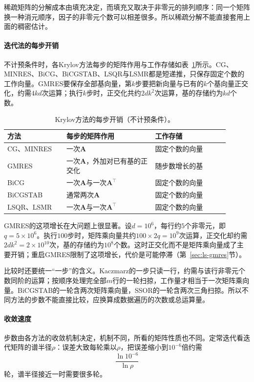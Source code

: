 稀疏矩阵的分解成本由填充决定，而填充又取决于非零元的排列顺序：同一个矩阵换一种消元顺序，因子的非零元个数可以相差很多。所以稀疏分解不能直接套用上面的稠密估计。

\paragraph{迭代法的每步开销}
不计预条件时，各Krylov方法每步的矩阵作用与工作存储如表~\ref{tab:ls-iterative-cost}所示。CG、MINRES、BiCG、BiCGSTAB、LSQR与LSMR都是短递推，只保存固定个数的工作向量。GMRES要保存全部基向量，第$k$步要把新向量与已有的$k$个基向量正交化，约需$4kd$次运算；执行$k$步时，正交化共约$2dk^2$次运算，基的存储约为$kd$个数。

\begin{table}[htbp]
\centering
\small
\begin{tabular}{@{}p{0.24\linewidth}p{0.36\linewidth}p{0.3\linewidth}@{}}
\toprule
方法 & 每步的矩阵作用 & 工作存储\\
\midrule
CG、MINRES & 一次$\bm A$ & 固定个数的向量\\
GMRES & 一次$\bm A$，外加对已有基的正交化 & 随步数增长的基\\
BiCG & 一次$\bm A$与一次$\bm A^\top$ & 固定个数的向量\\
BiCGSTAB & 通常两次$\bm A$ & 固定个数的向量\\
LSQR、LSMR & 一次$\bm A$与一次$\bm A^\top$ & 固定个数的向量\\
\bottomrule
\end{tabular}
\caption{Krylov方法的每步开销（不计预条件）。}
\label{tab:ls-iterative-cost}
\end{table}

GMRES的这项增长在大问题上很显著。设$d=10^6$，每行约$5$个非零元，即$q=5\times10^6$。执行$100$步时，矩阵乘向量共约$100\times2q=10^9$次运算，正交化却约需$2dk^2=2\times10^{10}$次，基的存储约为$10^8$个数。这时正交化而不是矩阵乘向量成了主要开销；重启GMRES限制了这项增长，代价是可能停滞（第~\ref{sec:ls-gmres}节）。

比较时还要统一“一步”的含义。Kaczmarz的一步只读一行，约需与该行非零元个数同阶的运算；按顺序处理完全部$m$行的一轮扫掠，工作量才相当于一次矩阵乘向量。BiCGSTAB的一轮含两次矩阵乘向量，SSOR的一轮含两次三角扫掠。所以不同方法的步数不能直接比较，应换算成数据遍历的次数或总运算量。

\paragraph{收敛速度}
步数由各方法的收敛机制决定，机制不同，所看的矩阵性质也不同。定常迭代看迭代矩阵的谱半径$\rho$：误差大致每轮乘以$\rho$，把误差缩小到$10^{-6}$倍约需
\begin{equation}
 \frac{\ln10^{-6}}{\ln\rho}
 \label{eq:ls-stationary-iteration-count}
\end{equation}
轮，谱半径接近一时需要很多轮。

